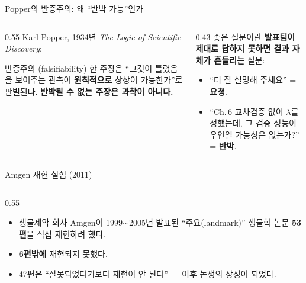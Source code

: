 \documentclass[aspectratio=169,11pt]{beamer}
\begin{document}
\begin{frame}{Popper의 반증주의: 왜 ``반박 가능''인가}
  \begin{columns}[T]
    \begin{column}{0.55\textwidth}
      Karl Popper, 1934년 \textit{The Logic of Scientific
      Discovery}:
      \begin{block}{반증주의 (falsifiability)}
        한 주장은 ``그것이 틀렸음을 보여주는 관측이
        \textbf{원칙적으로} 상상이 가능한가''로 판별된다.
        \textbf{반박될 수 없는 주장은 과학이 아니다.}
      \end{block}
    \end{column}
    \begin{column}{0.43\textwidth}
      좋은 질문이란 \textbf{발표팀이 제대로 답하지 못하면
      결과 자체가 흔들리는} 질문:
      \begin{itemize}
        \item ``더 잘 설명해 주세요'' = \textbf{요청}.
        \item ``Ch.\,6 교차검증 없이 $\lambda$를 정했는데, 그
          검증 성능이 우연일 가능성은 없는가?'' = \textbf{반박}.
      \end{itemize}
    \end{column}
  \end{columns}
\end{frame}

\begin{frame}{Amgen 재현 실험 (2011)}
  \begin{columns}[T]
    \begin{column}{0.55\textwidth}
      \begin{itemize}
        \item 생물제약 회사 Amgen이 1999$\sim$2005년 발표된
          ``주요(landmark)'' 생물학 논문 \textbf{53편}을 직접
          재현하려 했다.
        \item \textbf{6편밖에} 재현되지 못했다.
        \item 47편은 ``잘못되었다기보다 재현이 안 된다'' ---
          이후  논쟁의 상징이 되었다.
      \end{itemize}
    \end{column}
  \end{columns}
\end{frame}
\end{document}
